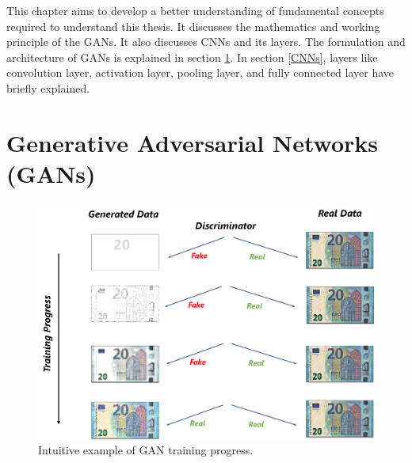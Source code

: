 \justifying
\setlength{\parskip}{1em}

This chapter aims to develop a better understanding of fundamental concepts required to understand this thesis. It discusses the mathematics and working principle of the \acp{GAN}. It also discusses \acp{CNN} and its layers. The formulation and architecture of \acp{GAN} is explained in section \ref{GenerativeAdversarialNetworks}. In section \ref{CNNs}, layers like convolution layer, activation layer, pooling layer, and fully connected layer have briefly explained.


\section{Generative Adversarial Networks (GANs)}\label{GenerativeAdversarialNetworks}

\begin{figure}[H]
        \begin{center}
	    \includegraphics[scale=0.25]{images/Fundamentals/GANTrainingintuition.png}
	    \caption[Intuitive example of \ac{GAN} training progress.]{Intuitive example of \ac{GAN} training progress.}
	    \label{fig:GANTrainingintuition}
	    \end{center}
\end{figure}

